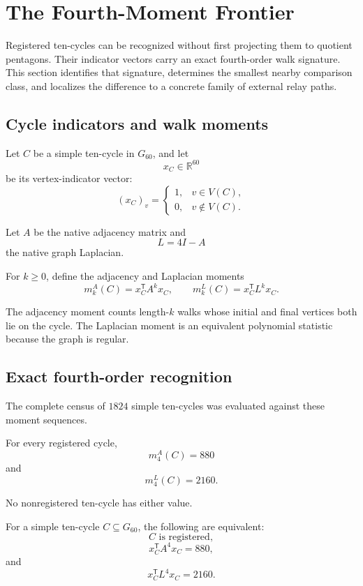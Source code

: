 \section{The Fourth-Moment Frontier}

Registered ten-cycles can be recognized without first projecting them
to quotient pentagons. Their indicator vectors carry an exact
fourth-order walk signature. This section identifies that signature,
determines the smallest nearby comparison class, and localizes the
difference to a concrete family of external relay paths.

\subsection{Cycle indicators and walk moments}

Let \(C\) be a simple ten-cycle in \(G_{60}\), and let
\[
x_C\in\mathbb R^{60}
\]
be its vertex-indicator vector:
\[
(x_C)_v
=
\begin{cases}
1, & v\in V(C),\\
0, & v\notin V(C).
\end{cases}
\]

Let \(A\) be the native adjacency matrix and
\[
L=4I-A
\]
the native graph Laplacian.

For \(k\geq0\), define the adjacency and Laplacian moments
\[
m_k^A(C)=x_C^{\mathsf T}A^k x_C,
\qquad
m_k^L(C)=x_C^{\mathsf T}L^k x_C.
\]

The adjacency moment counts length-\(k\) walks whose initial and final
vertices both lie on the cycle. The Laplacian moment is an equivalent
polynomial statistic because the graph is regular.

\subsection{Exact fourth-order recognition}

The complete census of \(1824\) simple ten-cycles was evaluated against
these moment sequences.

For every registered cycle,
\[
m_4^A(C)=880
\]
and
\[
m_4^L(C)=2160.
\]

No nonregistered ten-cycle has either value.

\begin{theorem}
For a simple ten-cycle \(C\subseteq G_{60}\), the following are
equivalent:
\[
C\text{ is registered},
\]
\[
x_C^{\mathsf T}A^4x_C=880,
\]
and
\[
x_C^{\mathsf T}L^4x_C=2160.
\]
\end{theorem}

